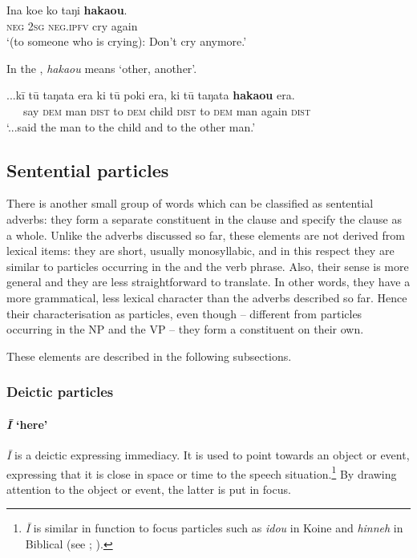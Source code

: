 \ea\label{ex:4.143}
\gll {\ꞌ}Ina koe ko taŋi \textbf{haka{\ꞌ}ou}.\\
\textsc{neg} \textsc{2sg} \textsc{neg.ipfv} cry again\\

\glt
‘(to someone who is crying): Don’t cry anymore.’ \textstyleExampleref{[R349.016]} 
\z

In the , \textit{haka{\ꞌ}ou} means ‘other, another’.

\ea\label{ex:4.144}
\gll ...kī tū taŋata era ki tū poki era, ki tū taŋata \textbf{haka{\ꞌ}ou} era. \\
~~~say \textsc{dem} man \textsc{dist} to \textsc{dem} child \textsc{dist} to \textsc{dem} man again \textsc{dist} \\

\glt 
‘...said the man to the child and to the other man.’ \textstyleExampleref{[R102.020]} 
\z
{}
\subsection{Sentential particles}\label{sec:4.5.4}

There is another small group of words which can be classified as sentential adverbs: they form a separate constituent in the clause and specify the clause as a whole. Unlike the adverbs discussed so far, these elements are not derived from lexical items: they are short, usually monosyllabic, and in this respect they are similar to particles occurring in the  and the verb phrase. Also, their sense is more general and they are less straightforward to translate. In other words, they have a more grammatical, less lexical character than the adverbs described so far. Hence their characterisation as particles, even though – different from particles occurring in the NP and the VP – they form a constituent on their own.

These elements are described in the following subsections.

\subsubsection{Deictic particles}\label{sec:4.5.4.1}
\paragraph[{\ꞌ}ī ‘here’]{\textit{{\ꞌ}Ī} ‘here’}\label{sec:4.5.4.1.1}
\textit{{\ꞌ}Ī} is a deictic  expressing immediacy. It is used to point towards an object or event, expressing that it is close in space or time to the speech situation.\footnote{\label{fn:200}\textit{{\ꞌ}Ī} is similar in function to focus particles such as \textit{idou} in Koine  and \textit{hinneh} in Biblical  (see \citealt[58, 82]{Levinsohn2007}; \citealt{Bailey2009}).} By drawing attention to the object or event, the latter is put in focus.

